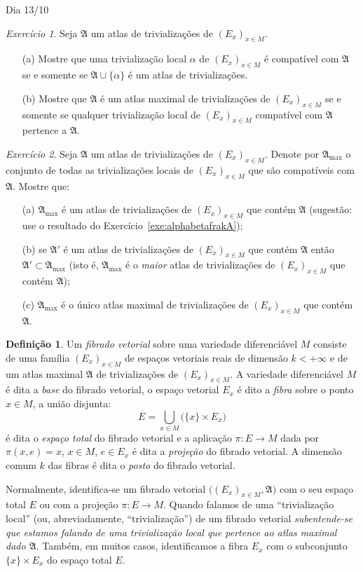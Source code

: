 \documentclass[oneside,11pt]{amsart}
\theoremstyle{remark}\newtheorem{exercise}{Exercício}[section]
\theoremstyle{plain}\newtheorem{teo}{Teorema}[section]
\theoremstyle{plain}\newtheorem{lem}[teo]{Lema}
\theoremstyle{plain}\newtheorem{prop}[teo]{Proposição}
\theoremstyle{definition}\newtheorem{defin}[teo]{Definição}
\theoremstyle{remark}\newtheorem{rem}[teo]{Observação}
\theoremstyle{definition}\newtheorem{example}[teo]{Exemplo}
\numberwithin{equation}{section}
\begin{document}
\begin{section}{Dia 13/10}
\begin{exercise}
Seja $\mathfrak A$ um atlas de trivializações de $(E_x)_{x\in M}$.
\begin{itemize}
\item[(a)] Mostre que uma trivialização local $\alpha$ de $(E_x)_{x\in M}$ é compatível com $\mathfrak A$ se e somente se $\mathfrak A\cup\{\alpha\}$ é um atlas
de trivializações.
\item[(b)] Mostre que $\mathfrak A$ é um atlas maximal de trivializações de $(E_x)_{x\in M}$ se e somente se qualquer trivialização local de $(E_x)_{x\in M}$
compatível com $\mathfrak A$ pertence a $\mathfrak A$.
\end{itemize}
\end{exercise}

\begin{exercise}
Seja $\mathfrak A$ um atlas de trivializações de $(E_x)_{x\in M}$. Denote por $\mathfrak A_{\max}$ o conjunto de todas as trivializações
locais de $(E_x)_{x\in M}$ que são compatíveis com $\mathfrak A$. Mostre que:
\begin{itemize}
\item[(a)] $\mathfrak A_{\max}$ é um atlas de trivializações de $(E_x)_{x\in M}$ que contém $\mathfrak A$ (sugestão: use o resultado do Exercício~\ref{exe:alphabetafrakA});
\item[(b)] se $\mathfrak A'$ é um atlas de trivializações de $(E_x)_{x\in M}$ que contém $\mathfrak A$ então $\mathfrak A'\subset\mathfrak A_{\max}$
(isto é, $\mathfrak A_{\max}$ é o {\em maior\/} atlas de trivializações de $(E_x)_{x\in M}$ que contém $\mathfrak A$);
\item[(c)] $\mathfrak A_{\max}$ é o único atlas maximal de trivializações de $(E_x)_{x\in M}$ que contém $\mathfrak A$.
\end{itemize}
\end{exercise}

\begin{defin}
Um {\em fibrado vetorial\/} sobre uma variedade diferenciável $M$ consiste de uma família $(E_x)_{x\in M}$ de espaços vetoriais reais de dimensão $k<+\infty$
e de um atlas maximal $\mathfrak A$ de trivializações de $(E_x)_{x\in M}$. A variedade diferenciável $M$ é dita a {\em base\/} do fibrado vetorial,
o espaço vetorial $E_x$ é dito a {\em fibra\/} sobre o ponto $x\in M$, a união disjunta:
\[E=\bigcup_{x\in M}\big(\{x\}\times E_x\big)\]
é dita o {\em espaço total\/} do fibrado vetorial e a aplicação $\pi:E\to M$ dada por $\pi(x,e)=x$, $x\in M$, $e\in E_x$ é dita a {\em projeção\/}
do fibrado vetorial. A dimensão comum $k$ das fibras é dita o {\em posto\/} do fibrado vetorial.
\end{defin}
Normalmente, identifica-se um fibrado vetorial $\big((E_x)_{x\in M},\mathfrak A\big)$ com o seu espaço total $E$ ou com a projeção $\pi:E\to M$.
Quando falamos de uma ``trivialização local'' (ou, abreviadamente, ``trivialização'') de um fibrado vetorial {\em subentende-se que estamos falando de uma
trivialização local que pertence ao atlas maximal dado $\mathfrak A$}. Também, em muitos casos, identificamos a fibra $E_x$ com o subconjunto
$\{x\}\times E_x$ do espaço total $E$.


\end{section}
\end{document}
